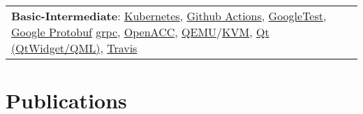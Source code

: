 \documentclass[a4paper,11pt]{article}
\begin{document}
\begin{tabularx}{\linewidth}{@{}l X@{}}
                       \textbf{Basic-Intermediate}:
                       \href{https://kubernetes.io/}{Kubernetes},
                       \href{https://github.com/features/actions}{Github Actions},
                       \href{https://google.github.io/googletest/}{GoogleTest},
                       \href{https://developers.google.com/protocol-buffers}{Google Protobuf}
                       \href{https://grpc.io/}{grpc},
                       \href{https://www.openacc.org/}{OpenACC},
                       \href{https://www.qemu.org/}{QEMU}/\href{https://www.linux-kvm.org/page/Main_Page}{KVM},
                       \href{https://www.qt.io/}{Qt (QtWidget/QML)},
                       \href{https://www.travis-ci.com/}{Travis} \\
\end{tabularx}

\section{Publications}
\begin{refsection}
    \nocite{*}
    \printbibliography[heading=none]
\end{refsection}


\vfill
{}
\end{document}
